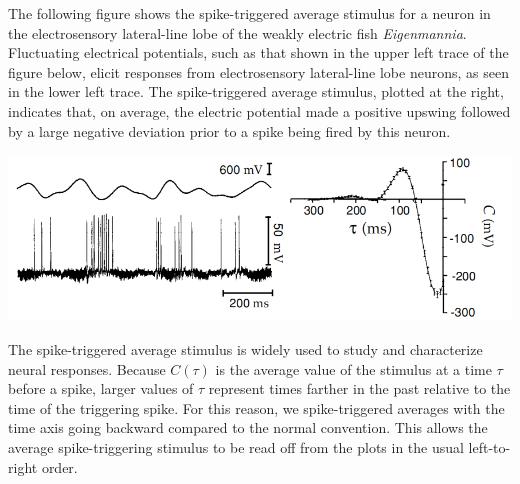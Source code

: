 \begin{exm}
  \label{exm:spi-tri-ave in elefish}
  The following figure shows the spike-triggered average stimulus for a neuron in the electrosensory lateral-line lobe of the weakly electric fish \emph{Eigenmannia}.
  Fluctuating electrical potentials, such as that shown in the upper left trace of the figure below,
  elicit responses from electrosensory lateral-line lobe neurons, as seen in the lower left trace. The spike-triggered average stimulus, plotted at the right, indicates that, on average, the electric potential made a positive upswing followed by a large negative deviation prior to a spike being fired by this neuron.
  \begin{center}
    \includegraphics[scale=0.3]{./png/spiTriAvST-elefish.png}
    \label{fig:1.9}
  \end{center}
\end{exm}


\begin{rem}
   The spike-triggered average stimulus is widely used to study and characterize neural responses. Because $C(\tau)$ is the average value of the stimulus at a time $\tau$ before a spike, larger values of $\tau$ represent times farther in the past relative to the time of the triggering spike. For this reason, we spike-triggered averages with the time axis going backward compared to the normal convention. This allows the average spike-triggering stimulus to be read off from the plots in the usual left-to-right order.
\end{rem}

